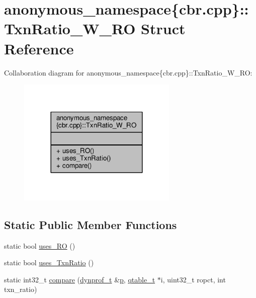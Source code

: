 \hypertarget{structanonymous__namespace_02cbr_8cpp_03_1_1TxnRatio__W__RO}{\section{anonymous\-\_\-namespace\{cbr.\-cpp\}\-:\-:Txn\-Ratio\-\_\-\-W\-\_\-\-R\-O Struct Reference}
\label{structanonymous__namespace_02cbr_8cpp_03_1_1TxnRatio__W__RO}
}


Collaboration diagram for anonymous\-\_\-namespace\{cbr.\-cpp\}\-:\-:Txn\-Ratio\-\_\-\-W\-\_\-\-R\-O\-:
\nopagebreak
\begin{figure}[H]
\begin{center}
\leavevmode
\includegraphics[width=216pt]{structanonymous__namespace_02cbr_8cpp_03_1_1TxnRatio__W__RO__coll__graph}
\end{center}
\end{figure}
\subsection*{Static Public Member Functions}
\begin{DoxyCompactItemize}
\item 
static bool \hyperlink{structanonymous__namespace_02cbr_8cpp_03_1_1TxnRatio__W__RO_adae29205bd3975b2d46273b806eb1671}{uses\-\_\-\-R\-O} ()
\item 
static bool \hyperlink{structanonymous__namespace_02cbr_8cpp_03_1_1TxnRatio__W__RO_adfff10868dc75cdd04d86fd2b7723cca}{uses\-\_\-\-Txn\-Ratio} ()
\item 
static int32\-\_\-t \hyperlink{structanonymous__namespace_02cbr_8cpp_03_1_1TxnRatio__W__RO_a41bc006bd2c35948a3c01ff7b5285f82}{compare} (\hyperlink{structstm_1_1dynprof__t}{dynprof\-\_\-t} \&\hyperlink{counted__ptr_8hpp_a5c9f59d7c24e3fd6ceae319a968fc3e0}{p}, \hyperlink{structstm_1_1qtable__t}{qtable\-\_\-t} $\ast$i, uint32\-\_\-t ropct, int txn\-\_\-ratio)
\end{DoxyCompactItemize}



